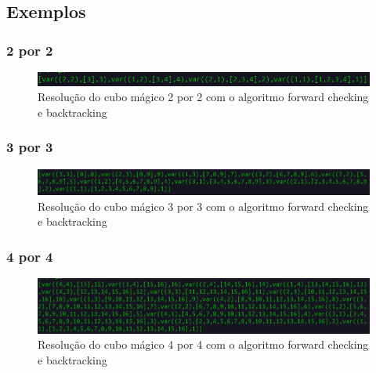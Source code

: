 \documentclass{article}
\begin{document}
\subsection{Exemplos}
\subsubsection{2 por 2}

\begin{figure}[ht]
    \centering
    \includegraphics[width=\textwidth,height=\textheight,keepaspectratio]{image6.png}
    \caption{Resolução do cubo mágico 2 por 2 com o algoritmo forward checking e backtracking}
    \label{fig:Resolução do cubo mágico 2 por 2 com o algoritmo forward checking e backtracking}
\end{figure}
\newpage
\subsubsection{3 por 3}

\begin{figure}[ht]
    \centering
    \includegraphics[width=\textwidth,height=\textheight,keepaspectratio]{image7.png}
    \caption{Resolução do cubo mágico 3 por 3 com o algoritmo forward checking e backtracking}
    \label{fig:Resolução do cubo mágico 3 por 3 com o algoritmo forward checking e backtracking}
\end{figure}

\subsubsection{4 por 4}

\begin{figure}[ht]
    \centering
    \includegraphics[width=\textwidth,height=\textheight,keepaspectratio]{image8.png}
    \caption{Resolução do cubo mágico 4 por 4 com o algoritmo forward checking e backtracking}
    \label{fig:Resolução do cubo mágico 4 por 4 com o algoritmo forward checking e backtracking}
\end{figure}
\end{document}
